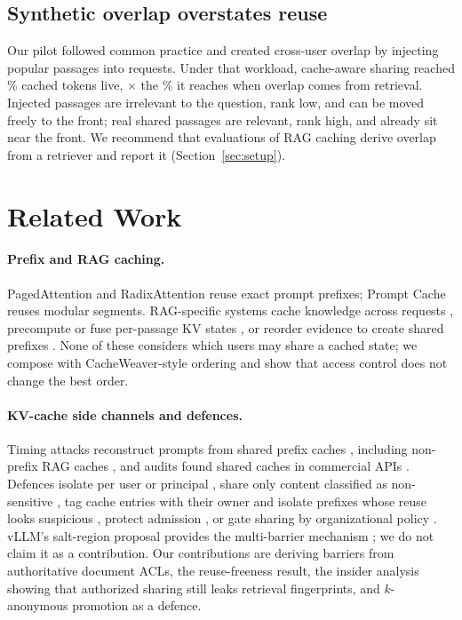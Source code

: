 \documentclass[11pt]{article}
\begin{document}
\subsection{Synthetic overlap overstates reuse}
\label{sec:synthetic}
Our pilot followed common practice and created cross-user overlap by injecting popular passages into requests. Under that workload, cache-aware sharing reached \numliveBsixCached\% cached tokens live, \numoverstate$\times$ the \numhqACLScopeTree\% it reaches when overlap comes from retrieval. Injected passages are irrelevant to the question, rank low, and can be moved freely to the front; real shared passages are relevant, rank high, and already sit near the front. We recommend that evaluations of RAG caching derive overlap from a retriever and report it (Section~\ref{sec:setup}).

\section{Related Work}
\label{sec:related}

\paragraph{Prefix and RAG caching.} PagedAttention \citep{kwon2023vllm} and RadixAttention \citep{zheng2024sglang} reuse exact prompt prefixes; Prompt Cache \citep{gim2024promptcache} reuses modular segments. RAG-specific systems cache knowledge across requests \citep{jin2024ragcache}, precompute or fuse per-passage KV states \citep{yao2025cacheblend,lu2024turborag,sun2024blockattention}, or reorder evidence to create shared prefixes \citep{tan2026cacheweaver}. None of these considers which users may share a cached state; we compose with CacheWeaver-style ordering and show that access control does not change the best order.

\paragraph{KV-cache side channels and defences.} Timing attacks reconstruct prompts from shared prefix caches \citep{wu2025promptpeek,zheng2024inputsnatch,song2024earlybird}, including non-prefix RAG caches \citep{sun2026spliceleak}, and audits found shared caches in commercial APIs \citep{gu2025audit,keypooling2026}. Defences isolate per user or principal \citep{vllm2026security,addagada2026kvgov}, share only content classified as non-sensitive \citep{chu2025safekv,wu2026cacheprune}, tag cache entries with their owner and isolate prefixes whose reuse looks suspicious \citep{pennas2026prefixwall}, protect admission \citep{prefixshield2026}, or gate sharing by organizational policy \citep{edgestandard2026,ndss2026kvprivacy}. vLLM's salt-region proposal provides the multi-barrier mechanism \citep{vllm2025rfc,vllm2026saltregions}; we do not claim it as a contribution. Our contributions are deriving barriers from authoritative document ACLs, the reuse-freeness result, the insider analysis showing that authorized sharing still leaks retrieval fingerprints, and $k$-anonymous promotion as a defence.
\end{document}
